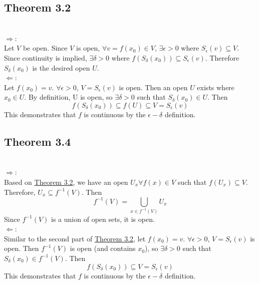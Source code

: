 \subsection{Theorem 3.2} \label{thm4.3.2}
\setcounter{question}{0}

 
 
\begin{solution}
 \\$\Rightarrow$: \\
 Let $V$ be open. Since $V$ is open, $\forall v = f(x_0) \in V$, $\exists \epsilon > 0$ where $S_\epsilon(v) \subseteq V$. Since continuity is implied, $\exists \delta > 0$ where $f(S_\delta(x_0)) \subseteq S_\epsilon(v)$. Therefore $S_\delta(x_0)$ is the desired open $U$. \\
 $\Leftarrow$: \\
 Let $f(x_0) = v$. $\forall \epsilon > 0$, $V = S_\epsilon(v)$ is open. Then an open $U$ exists where $x_0 \in U$. By definition, U is open, so $\exists \delta > 0$ such that $S_\delta(x_0) \in U$. Then
 $$f(S_\delta(x_0)) \subseteq f(U) \subseteq V = S_\epsilon(v)$$
 This demonstrates that $f$ is continuous by the $\epsilon-\delta$ definition.
\end{solution}

\subsection{Theorem 3.4}
\setcounter{question}{0}


\begin{solution}
 \\$\Rightarrow$: \\
 Based on \hyperref[thm4.3.2]{Theorem 3.2}, we have an open $U_x \forall f(x) \in V$ such that $f(U_x) \subseteq V$. Therefore, $U_x \subseteq f^{-1}(V)$. Then
 $$f^{-1}(V) = \bigcup_{x \in f^{-1}(V)} U_x$$
 Since $f^{-1}(V)$ is a union of open sets, it is open. \\
 $\Leftarrow$: \\
 Similar to the second part of \hyperref[thm4.3.2]{Theorem 3.2}, let $f(x_0) = v$. $\forall \epsilon > 0$, $V = S_\epsilon(v)$ is open. Then $f^{-1}(V)$ is open (and contains $x_0$), so $\exists \delta > 0$ such that $S_\delta(x_0) \in f^{-1}(V)$. Then
 $$f(S_\delta(x_0)) \subseteq V = S_\epsilon(v)$$
 This demonstrates that $f$ is continuous by the $\epsilon-\delta$ definition.
\end{solution}

